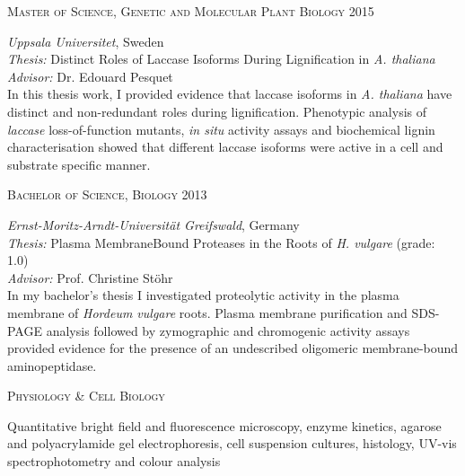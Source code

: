 \documentclass[11pt]{article}
\begin{document}
\textsc{\large{Master of Science, Genetic and Molecular Plant Biology}} \hfill \textsc{2015}
\begin{addmargin}[24pt]{0pt}
	\textit{Uppsala Universitet}, Sweden \\
	\textit{Thesis:} Distinct Roles of Laccase Isoforms During Lignification in \textit{ A. thaliana}\\
	\textit{Advisor:} Dr. Edouard Pesquet
	\vspace{0.1cm} \\
	\small{In this thesis work, I provided evidence that laccase isoforms in \textit{A. thaliana} have distinct and non-redundant roles during lignification. Phenotypic analysis of \textit{laccase} loss-of-function mutants, \textit{in situ} activity assays and biochemical lignin characterisation showed that different laccase isoforms were active in a cell and substrate specific manner.}
\end{addmargin}
\vspace{0.5cm}

\textsc{\large{Bachelor of Science, Biology}} \hfill \textsc{2013}
\begin{addmargin}[24pt]{0pt}
	\textit{Ernst-Moritz-Arndt-Universität Greifswald}, Germany \\
	\textit{Thesis:} Plasma Membrane\textendash Bound Proteases in the Roots of \textit{H. vulgare} (grade: \textsc{1.0}) \\
	\textit{Advisor:} Prof. Christine Stöhr
	\vspace{0.1cm} \\
	\small{In my bachelor's thesis I investigated proteolytic activity in the plasma membrane of \textit{Hordeum vulgare} roots. Plasma membrane purification and SDS-PAGE analysis followed by zymographic and chromogenic activity assays provided evidence for the presence of an undescribed oligomeric membrane-bound aminopeptidase.}
\end{addmargin}
\vspace{1cm}

\vspace{0.2cm}

\textsc{\large{Physiology \& Cell Biology}} 
\begin{addmargin}[24pt]{0pt}
	Quantitative bright field and fluorescence microscopy, enzyme kinetics, agarose and polyacrylamide gel electrophoresis, cell suspension cultures, histology, UV-vis spectrophotometry and colour analysis 
\end{addmargin}
\vspace{0.2cm}
\end{document}
